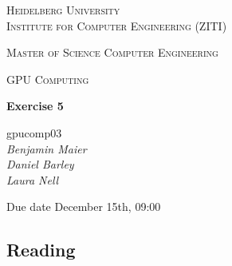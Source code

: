 \documentclass[12pt]{article}
\newcommand{\lecture}{GPU Computing}
\newcommand{\exercise}{Exercise 5}
\newcommand{\groupnumber}{gpucomp03}
\newcommand{\groupmemberslist}{Benjamin Maier\\Daniel Barley\\Laura Nell}
\newcommand{\duedate}{December 15th, 09:00}
\begin{document}
	\begin{titlepage}
		\centering

		{\scshape\LARGE Heidelberg University\\Institute for Computer Engineering (ZITI) \par}
		\vspace{1.5cm}
		{\scshape\Large Master of Science Computer Engineering \par}
		\vspace{0.5cm}
		{\scshape\Large \lecture \par}
		\vspace{1.5cm}
		{\huge\bfseries \exercise \par}
		\vspace{2cm}
		{\Large \groupnumber \itshape \\ \vspace{30pt} \groupmemberslist \par}
		\vfill
		
		
		{\large Due date \duedate \par}
	\end{titlepage}

\setcounter{section}{5}

\subsection{Reading}
\end{document}
